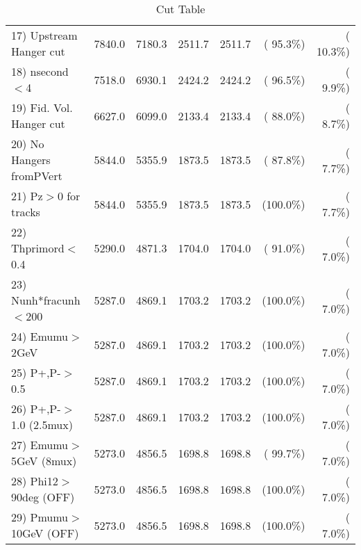 \begin{table}[h!]
\begin{tabular}{||l||r|r|r|r|r|r||}
 17) Upstream Hanger cut  &       7840.0 &       7180.3 &       2511.7 &       2511.7 & ( 95.3\%) & ( 10.3\%) \\
 18) nsecond$<$4          &       7518.0 &       6930.1 &       2424.2 &       2424.2 & ( 96.5\%) & (  9.9\%) \\
 19) Fid. Vol. Hanger cut &       6627.0 &       6099.0 &       2133.4 &       2133.4 & ( 88.0\%) & (  8.7\%) \\
 20) No Hangers fromPVert &       5844.0 &       5355.9 &       1873.5 &       1873.5 & ( 87.8\%) & (  7.7\%) \\
 21) Pz$>$0 for tracks    &       5844.0 &       5355.9 &       1873.5 &       1873.5 & (100.0\%) & (  7.7\%) \\
 22) Thprimord$<$0.4      &       5290.0 &       4871.3 &       1704.0 &       1704.0 & ( 91.0\%) & (  7.0\%) \\
 23) Nunh*fracunh$<$200   &       5287.0 &       4869.1 &       1703.2 &       1703.2 & (100.0\%) & (  7.0\%) \\
 24) Emumu$>$2GeV         &       5287.0 &       4869.1 &       1703.2 &       1703.2 & (100.0\%) & (  7.0\%) \\
 25) P+,P-$>$0.5          &       5287.0 &       4869.1 &       1703.2 &       1703.2 & (100.0\%) & (  7.0\%) \\
 26) P+,P-$>$1.0 (2.5mux) &       5287.0 &       4869.1 &       1703.2 &       1703.2 & (100.0\%) & (  7.0\%) \\
 27) Emumu$>$5GeV  (8mux) &       5273.0 &       4856.5 &       1698.8 &       1698.8 & ( 99.7\%) & (  7.0\%) \\
 28) Phi12$>$90deg  (OFF) &       5273.0 &       4856.5 &       1698.8 &       1698.8 & (100.0\%) & (  7.0\%) \\
 29) Pmumu$>$10GeV  (OFF) &       5273.0 &       4856.5 &       1698.8 &       1698.8 & (100.0\%) & (  7.0\%) \\
 \hline
 \hline
 \end{tabular}
 \caption{Cut Table           }
 \label{tab-cutcohjpsi-mumu_ccdis}
 \end{table}
